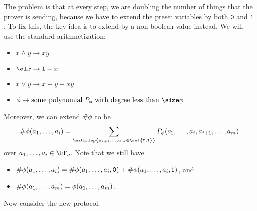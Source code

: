 \documentclass{standalone}
\begin{document}
The problem is that at every step, we are doubling the number of things that
the prover is sending, because we have to extend the preset variables
by both \(\mathtt 0\) and \(\mathtt 1\).
To fix this, the key idea is to extend by a non-boolean value instead.
We will use the standard arithmetization:
\begin{itemize}[nosep]
	\item \(x \land y \to xy\)
	\item \(\ol x \to 1 - x\)
	\item \(x \lor y \to x + y - xy\)
	\item \(\phi \to \text{some polynomial $P_\phi$ with degree
    less than $\size \phi$}\)
\end{itemize}
Moreover, we can extend \(\operatorname{\textsf\#\phi}\) to be
\[
	\numphi(a_1, \dots, a_i) =
    \sum_{\mathclap{a_{i + 1}, \dots, a_{m} \in \set{\mathtt 0, \mathtt 1}}}
      P_\phi(a_1, \dots, a_i, a_{i + 1}, \dots, a_{m})
\]
over \(a_1, \dots, a_i \in \FF_q\).
Note that we still have
\begin{itemize}
	\item \(\operatorname{\textsf\#\phi}(a_1, \dots, a_i) = \operatorname{\textsf\#\phi}(a_1, \dots, a_i, \mathtt 0) +
                                     \operatorname{\textsf\#\phi}(a_1, \dots, a_i, \mathtt 1)\), and
	\item \(\operatorname{\textsf\#\phi}(a_1, \dots, a_m) = \phi(a_1, \dots, a_m)\).
\end{itemize}
Now consider the new protocol:
\end{document}
